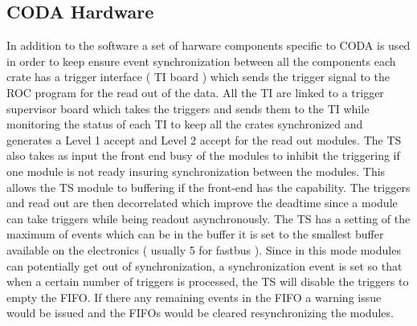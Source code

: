 \documentclass{article}
\begin{document}
\subsection{CODA Hardware}
In addition to the software a set of harware components specific to CODA is used in order to keep ensure event synchronization between all the components each crate has a trigger interface ( TI board ) which sends the trigger signal to the ROC program for the read out of the data. All the TI are linked to a trigger supervisor board which takes the triggers and sends them to the TI while monitoring the status of each TI to keep all the crates synchronized and generates a Level 1 accept and Level 2 accept for the read out modules. The TS also takes as input the front end busy of the modules to inhibit the triggering if one module is not ready insuring synchronization between the modules.
This allows the TS module to buffering if the front-end has the capability. The triggers and read out are then decorrelated which improve the deadtime since a module can take triggers while being readout asynchronously. The TS has a setting of the maximum of events which can be in the buffer it is set to the smallest buffer available on the electronics ( usually 5 for fastbus ). Since in this mode modules can potentially get out of synchronization, a synchronization event is set so that when a certain number of triggers is processed, the TS will disable the triggers to empty the FIFO. If there any remaining events in the FIFO a warning issue would be issued and the FIFOs would be cleared resynchronizing the modules.
\end{document}
